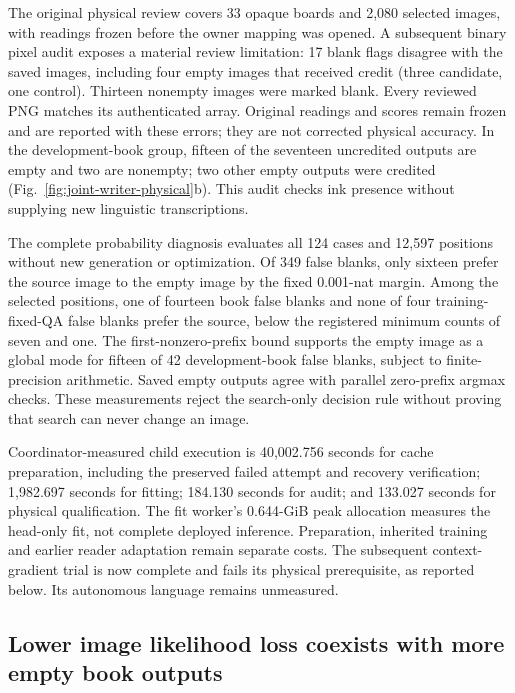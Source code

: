 \documentclass[12pt,a4paper]{article}
\providecommand{\DIFadd}[1]{{\protect\color{blue} \sf #1}} %
\begin{document}
\DIFadd{The original physical review covers 33 opaque boards and 2,080 selected images,
with readings frozen before the owner mapping was opened. A subsequent binary
pixel audit exposes a material review limitation: 17 blank flags disagree with
the saved images, including four empty images that received credit (three
candidate, one control). Thirteen nonempty images were marked blank. Every
reviewed PNG matches its authenticated array. Original readings and scores
remain frozen and are reported with these errors; they are not corrected
physical accuracy. In the development-book group, fifteen of the seventeen
uncredited outputs are empty and two are nonempty; two other empty outputs were
credited (Fig.~\ref{fig:joint-writer-physical}b). This audit checks ink presence
without supplying new linguistic transcriptions.
}

\DIFadd{The complete probability diagnosis evaluates all 124 cases and 12,597 positions
without new generation or optimization. Of 349 false blanks, only sixteen
prefer the source image to the empty image by the fixed 0.001-nat margin. Among
the selected positions, one of fourteen book false blanks and none of four
training-fixed-QA false blanks prefer the source, below the registered minimum
counts of seven and one. The first-nonzero-prefix bound supports the empty image
as a global mode for fifteen of 42 development-book false blanks, subject to
finite-precision arithmetic. Saved empty outputs agree with parallel zero-prefix
argmax checks. These measurements reject the search-only decision rule without
proving that search can never change an image.
}

\DIFadd{Coordinator-measured child execution is 40,002.756 seconds for cache preparation,
including the preserved failed attempt and recovery verification; 1,982.697
seconds for fitting; 184.130 seconds for audit; and 133.027 seconds for physical
qualification. The fit worker's 0.644-GiB peak allocation measures the head-only
fit, not complete deployed inference. Preparation, inherited training and
earlier reader adaptation remain separate costs. The subsequent context-gradient
trial is now complete and fails its physical prerequisite, as reported below.
Its autonomous language remains unmeasured.
}

\subsection*{\DIFadd{Lower image likelihood loss coexists with more empty book outputs}}
\end{document}
